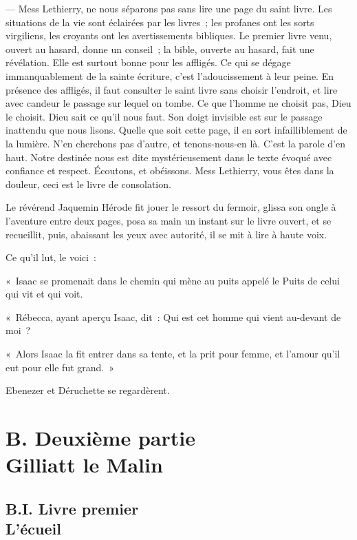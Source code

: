 \documentclass[french,twoside]{book} %
\begin{document}
— Mess Lethierry, ne nous séparons pas sans lire une page du saint livre. Les situations de la vie sont éclairées par les livres ; les profanes ont les sorts virgiliens, les croyants ont les avertissements bibliques. Le premier livre venu, ouvert au hasard, donne un conseil ; la bible, ouverte au hasard, fait une révélation. Elle est surtout bonne pour les affligés. Ce qui se dégage immanquablement de la sainte écriture, c’est l’adoucissement à leur peine. En présence des affligés, il faut consulter le saint livre sans choisir l’endroit, et lire avec candeur le passage sur lequel on tombe. Ce que l’homme ne choisit pas, Dieu le choisit. Dieu sait ce qu’il nous faut. Son doigt invisible est sur le passage inattendu que nous lisons. Quelle que soit cette page, il en sort infailliblement de la lumière. N’en cherchons pas d’autre, et tenons-nous-en là. C’est la parole d’en haut. Notre destinée nous est dite mystérieusement dans le texte évoqué avec confiance et respect. Écoutons, et obéissons. Mess Lethierry, vous êtes dans la douleur, ceci est le livre de consolation.\par
Le révérend Jaquemin Hérode fit jouer le ressort du fermoir, glissa son ongle à l’aventure entre deux pages, posa sa main un instant sur le livre ouvert, et se recueillit, puis, abaissant les yeux avec autorité, il se mit à lire à haute voix.\par
Ce qu’il lut, le voici :\par
« Isaac se promenait dans le chemin qui mène au puits appelé le Puits de celui qui vit et qui voit.\par
 « Rébecca, ayant aperçu Isaac, dit : Qui est cet homme qui vient au-devant de moi ?\par
« Alors Isaac la fit entrer dans sa tente, et la prit pour femme, et l’amour qu’il eut pour elle fut grand. »\par
Ebenezer et Déruchette se regardèrent.
 \section[{B. Deuxième partie. Gilliatt le Malin}]{B. Deuxième partie \\
Gilliatt le Malin}\renewcommand{\leftmark}{B. Deuxième partie \\
Gilliatt le Malin}

  \subsection[{B.I. Livre premier. L’écueil}]{B.I. Livre premier \\
L’écueil}
\end{document}
